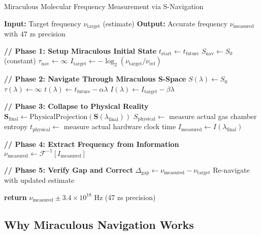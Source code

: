 \documentclass[12pt,a4paper]{article}
\begin{document}
\begin{algorithm}[H]
\caption{Miraculous Molecular Frequency Measurement via S-Navigation}
\begin{algorithmic}[1]
\State \textbf{Input:} Target frequency $\nu_{\text{target}}$ (estimate)
\State \textbf{Output:} Accurate frequency $\nu_{\text{measured}}$ with 47 zs precision

\State \textbf{// Phase 1: Setup Miraculous Initial State}
\State $t_{\text{start}} \gets t_{\text{future}}$ 
\State $S_{\text{nav}} \gets S_0$ (constant) 
\State $\tau_{\text{nav}} \gets \infty$ 
\State $I_{\text{target}} \gets -\log_2(\nu_{\text{target}}/\nu_{\text{ref}})$ 

\State \textbf{// Phase 2: Navigate Through Miraculous S-Space}
    \State $S(\lambda) \gets S_0$ 
    \State $\tau(\lambda) \gets \infty$ 
    \State $t(\lambda) \gets t_{\text{future}} - \alpha\lambda$ 
    \State $I(\lambda) \gets I_{\text{target}} - \beta\lambda$ 
\EndFor

\State \textbf{// Phase 3: Collapse to Physical Reality}
\State $\mathbf{S}_{\text{final}} \gets \text{PhysicalProjection}(\mathbf{S}(\lambda_{\text{final}}))$
\State $S_{\text{physical}} \gets $ measure actual gas chamber entropy
\State $t_{\text{physical}} \gets $ measure actual hardware clock time
\State $I_{\text{measured}} \gets I(\lambda_{\text{final}})$ 

\State \textbf{// Phase 4: Extract Frequency from Information}
\State $\nu_{\text{measured}} \gets \mathcal{F}^{-1}[I_{\text{measured}}]$

\State \textbf{// Phase 5: Verify Gap and Correct}
\State $\Delta_{\text{gap}} \gets \nu_{\text{measured}} - \nu_{\text{target}}$
    \State Re-navigate with updated estimate
\EndIf

\State \textbf{return} $\nu_{\text{measured}} \pm 3.4 \times 10^{18}$ Hz (47 zs precision)
\end{algorithmic}
\end{algorithm}

\subsection{Why Miraculous Navigation Works}
\end{document}
